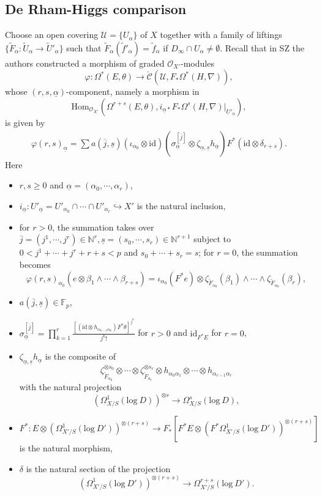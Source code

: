 \documentclass[12pt, a4paper]{article}
\begin{document}
\subsection{De Rham-Higgs comparison}
Choose an open covering $\mathcal U=\{U_\alpha\}$ of $X$ together with a family of liftings $\{\tilde F_\alpha:\tilde U_\alpha\to\tilde U'_\alpha\}$ such that $\tilde F_\alpha(\tilde f'_\alpha)=\tilde f_\alpha$ if $D_\infty\cap U_\alpha\neq\emptyset$. Recall that in SZ the authors constructed a morphism of graded $\mathcal O_{X'}$-modules
$$
\varphi:\Omega^*(E,\theta)\to\check{\mathcal C}(\mathcal U,F_*\Omega^*(H,\nabla)),$$
whose $(r,s,\underline\alpha)$-component, namely a morphism in
$$
\mathrm{Hom}_{\mathcal O_{X'}}(\Omega^{r+s}(E,\theta),i_{\underline\alpha*} F_*\Omega^s(H,\nabla)|_{U'_{\underline\alpha}}),
$$
 is given by
\begin{eqnarray}\label{construction varphi}
\varphi(r,s)_{\underline\alpha}=\sum a(\overline j,\underline s)(\iota_{\alpha_0}\otimes\mathrm{id})(\sigma_{\underline\alpha}^{[\overline j]}\otimes\zeta_{\underline\alpha,\underline s}h_{\underline\alpha})F^*(\mathrm{id}\otimes\delta_{r+s}).
\end{eqnarray}
Here 
\begin{itemize}
\item $r,s\geq0$ and $\underline\alpha=(\alpha_0,\cdots,\alpha_r)$,
\item $i_{\underline\alpha}:U'_{\underline\alpha}=U'_{\alpha_0}\cap\cdots\cap U'_{\alpha_r}\hookrightarrow X'$ is the natural inclusion,
\item for $r>0$, the summation takes over $\overline j=(j^1,\cdots,j^r)\in\mathbb N^r,\underline s=(s_0,\cdots,s_r)\in\mathbb N^{r+1}$ subject to $0<j^1+\cdots+j^r+r+s<p$ and $s_0+\cdots+s_r=s$; for $r=0$, the summation becomes
$$\varphi(r,s)_{\alpha_0}(e\otimes\beta_1\wedge\cdots\wedge\beta_{r+s})=\iota_{\alpha_0}(F^*e)\otimes\zeta_{\tilde F_{\alpha_0}}(\beta_1)\wedge\cdots\wedge\zeta_{\tilde F_{\alpha_0}}(\beta_r),$$
\item $a(\overline j,\underline s)\in\mathbb F_p$,
\item $\sigma^{[\overline j]}_{\underline\alpha}=\prod_{k=1}^r\frac{[(\mathrm{id}\otimes h_{\alpha_{k-1}\alpha_k})F^*\theta]^{j^k}}{j^k!}$ for $r>0$ and $\mathrm{id}_{F^*E}$ for $r=0$,
\item $\zeta_{\underline\alpha,\underline s}h_{\underline\alpha}$ is the composite of 
$$\zeta^{\otimes s_0}_{\tilde F_{\alpha_0}}\otimes\cdots\otimes\zeta^{\otimes s_r}_{\tilde F_{\alpha_r}}\otimes h_{\alpha_0\alpha_1}\otimes\cdots\otimes h_{\alpha_{r-1}\alpha_r}$$
with the natural projection
$$
(\Omega^1_{X/S}(\mathrm{log}~D))^{\otimes s}\to\Omega^s_{X/S}(\mathrm{log}~D),
$$ 
\item $F^*:E\otimes(\Omega^1_{X'/S}(\mathrm{log}~D'))^{\otimes(r+s)}\to F_*[F^*E\otimes (F^*\Omega^1_{X'/S}(\mathrm{log}~D'))^{\otimes(r+s)}]$ is the natural morphism,
\item $\delta$ is the natural section of the projection $$(\Omega^1_{X'/S}(\mathrm{log}~D'))^{\otimes(r+s)}\to\Omega^{r+s}_{X'/S}(\mathrm{log}~D').$$
\end{itemize}
\end{document}
